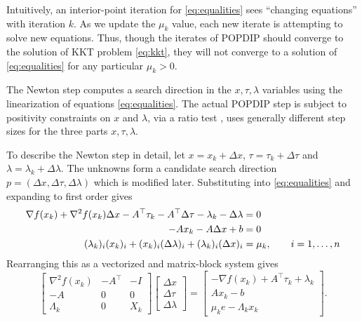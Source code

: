 \documentclass[11pt]{article}
\newcommand{\grad}{\nabla}
\begin{document}
Intuitively, an interior-point iteration for \eqref{eq:equalities} sees ``changing equations'' with iteration $k$.  As we update the $\mu_k$ value, each new iterate is attempting to solve new equations.  Thus, though the iterates of POPDIP should converge to the solution of KKT problem \eqref{eq:kkt}, they will not converge to a solution of \eqref{eq:equalities} for any particular $\mu_k>0$.

The Newton step computes a search direction in the $x,\tau,\lambda$ variables using the linearization of equations \eqref{eq:equalities}.  The actual POPDIP step is subject to positivity constraints on $x$ and $\lambda$, via a ratio test \cite[section 3.1]{GrivaNashSofer2009}, uses generally different step sizes for the three parts $x,\tau,\lambda$.

To describe the Newton step in detail, let $x=x_k+\Delta x$, $\tau=\tau_k+\Delta\tau$ and $\lambda=\lambda_k+\Delta\lambda$.  The unknowns form a candidate search direction $p=(\Delta x,\Delta\tau,\Delta\lambda)$ which is modified later.  Substituting into \eqref{eq:equalities} and expanding to first order gives
\begin{align}
\grad f(x_k) + \grad^2 f(x_k) \Delta x - A^\top \tau_k - A^\top \Delta \tau - \lambda_k - \Delta \lambda &= 0 \label{eq:prenewtonstep} \\
-A x_k - A \Delta x + b &= 0 \notag \\
(\lambda_k)_i (x_k)_i + (x_k)_i (\Delta\lambda)_i + (\lambda_k)_i (\Delta x)_i &= \mu_k, \qquad i=1,\dots,n \notag
\end{align}
Rearranging this as a vectorized and matrix-block system gives
\begin{equation}
\begin{bmatrix}
\grad^2 f(x_k) & -A^\top & -I \\
-A             & 0       & 0  \\
\Lambda_k      & 0       & X_k
\end{bmatrix}
\begin{bmatrix}
\Delta x \\
\Delta \tau \\
\Delta \lambda
\end{bmatrix}
=
\begin{bmatrix}
-\grad f(x_k) + A^\top \tau_k + \lambda_k \\
A x_k - b \\
\mu_k e - \Lambda_k x_k
\end{bmatrix}. \label{eq:unreducednewtonstep}
\end{equation}
\end{document}
